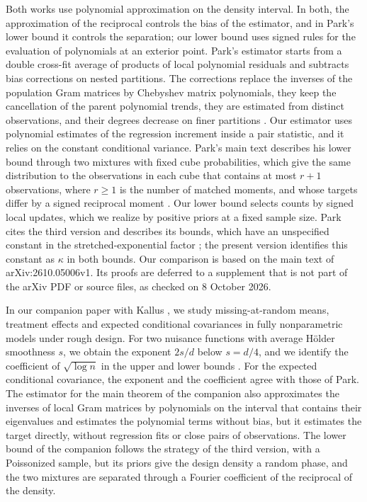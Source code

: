 Both works use polynomial approximation on the density interval. In
both, the approximation of the reciprocal controls the bias of the
estimator, and in Park's lower bound it controls the separation; our
lower bound uses signed rules for the evaluation of polynomials at an
exterior point. Park's estimator starts from a double cross-fit average of
products of local polynomial residuals and subtracts bias corrections
on nested partitions. The corrections replace the inverses of the
population Gram matrices by Chebyshev matrix polynomials, they keep the
cancellation of the parent polynomial trends, they are estimated from
distinct observations, and their degrees decrease on finer partitions
\cite[Section~3]{Park2026}. Our estimator uses polynomial estimates of
the regression increment inside a pair statistic, and it relies on the
constant conditional variance. Park's main text describes his lower
bound through two mixtures with fixed cube probabilities, which give the
same distribution to the observations in each cube that contains at
most $r+1$ observations, where $r\ge1$ is the number of matched
moments, and whose targets differ by a signed reciprocal
moment \cite[Section~2]{Park2026}. Our lower bound selects counts by
signed local updates, which we realize by positive priors at a fixed
sample size. Park cites the third version and describes its
bounds, which have an unspecified constant in the
stretched-exponential factor \cite[Sections~1 and~8]{Park2026}; the
present version identifies this constant as $\kappa$ in both bounds.
Our comparison is based on the main text of arXiv:2610.05006v1. Its
proofs are deferred to a supplement that is not part of the arXiv PDF
or source files, as checked on 8 October 2026.

In our companion paper with Kallus \cite{AronowKallusLopatto2026}, we
study missing-at-random means, treatment effects and expected
conditional covariances in fully nonparametric models under rough
design. For two nuisance functions with average H\"older smoothness $s$,
we obtain the exponent $2s/d$ below $s=d/4$, and we identify the
coefficient of $\sqrt{\log n}$ in the upper and lower bounds
\cite[Theorem~2.3]{AronowKallusLopatto2026}. For the expected
conditional covariance, the exponent and the coefficient agree with
those of Park. The estimator for the main theorem of the companion also approximates
the inverses of local Gram matrices by polynomials on the interval that
contains their eigenvalues and estimates the polynomial terms without
bias, but it estimates the target directly, without regression fits or
close pairs of observations. The lower bound of the companion
follows the strategy of the third version, with a Poissonized sample,
but its priors give the design density a random
phase, and the two mixtures are separated through a Fourier
coefficient of the reciprocal of the density.

